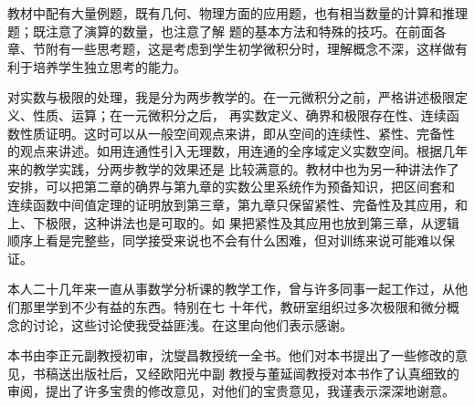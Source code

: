 \begin{preface}
教材中配有大量例题，既有几何、物理方面的应用题，也有相当数量的计算和推理题；既注意了演算的数量，也注意了解
题的基本方法和特殊的技巧。在前面各章、节附有一些思考题，这是考虑到学生初学微积分时，理解概念不深，这样做有
利于培养学生独立思考的能力。

对实数与极限的处理，我是分为两步教学的。在一元微积分之前，严格讲述极限定义、性质、运算；在一元微积分之后，%
再实数定义、确界和极限存在性、连续函数性质证明。这时可以从一般空间观点来讲，即从空间的连续性、紧性、完备性
的观点来讲述。如用连通性引入无理数，用连通的全序域定义实数空间。根据几年来的教学实践，分两步教学的效果还是
比较满意的。教材中也为另一种讲法作了安排，可以把第二章的确界与第九章的实数公里系统作为预备知识，把区间套和
连续函数中间值定理的证明放到第三章，第九章只保留紧性、完备性及其应用，和上、下极限，这种讲法也是可取的。如
果把紧性及其应用也放到第三章，从逻辑顺序上看是完整些，同学接受来说也不会有什么困难，但对训练来说可能难以保
证。

本人二十几年来一直从事数学分析课的教学工作，曾与许多同事一起工作过，从他们那里学到不少有益的东西。特别在七
十年代，教研室组织过多次极限和微分概念的讨论，这些讨论使我受益匪浅。在这里向他们表示感谢。

本书由李正元副教授初审，沈燮昌教授统一全书。他们对本书提出了一些修改的意见，书稿送出版社后，又经欧阳光中副
教授与董延闿教授对本书作了认真细致的审阅，提出了许多宝贵的修改意见，对他们的宝贵意见，我谨表示深深地谢意。
\end{preface}

\endinput
